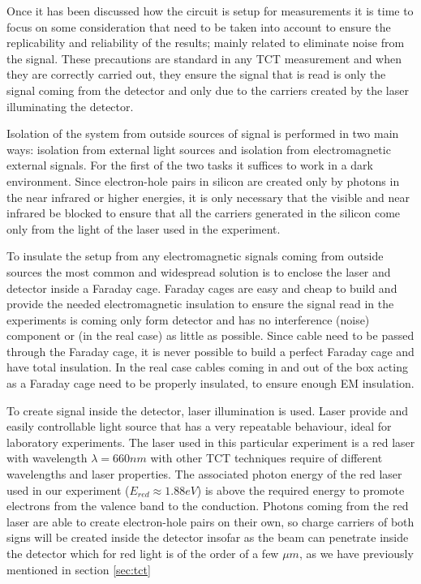 Once it has been discussed how the circuit is setup for measurements it is time to focus on some consideration that need to be taken into account to ensure the replicability and reliability of the results; mainly related to eliminate noise from the signal. These precautions are standard in any TCT measurement and when they are correctly carried out, they ensure the signal that is read is  only the signal coming from the detector and only due to the carriers created by the laser illuminating the detector.

Isolation of the system from outside sources of signal is performed in two main ways: isolation from external light sources and isolation from electromagnetic external signals. For the first of the two tasks it suffices to work in a dark environment. Since electron-hole pairs in silicon are created only by photons in the near infrared or higher energies, it is only necessary that the visible and near infrared be blocked to ensure that all the carriers generated in the silicon come only from the light of the laser used in the experiment.

To insulate the setup from any electromagnetic signals coming from outside sources the most common and widespread solution is to enclose the laser and detector inside a Faraday cage. Faraday cages are easy and cheap to build and provide the needed electromagnetic insulation to ensure the signal read in the experiments is coming only form detector and has no interference (noise) component or (in the real case) as little as possible. Since cable need to be passed through the Faraday cage, it is never possible to build a perfect Faraday cage and have total insulation. In the real case cables coming in and out of the box acting as a Faraday cage need to be properly insulated, to ensure enough EM insulation.

To create signal inside the detector, laser illumination is used. Laser provide and easily controllable light source that has a very repeatable behaviour, ideal for laboratory experiments. The laser used in this particular experiment is a red laser with wavelength $\lambda = 660nm$ with other TCT techniques require of different wavelengths and laser properties. The associated photon energy of the red laser used in our experiment ($E_{red} \approx 1.88 eV$) is above the required energy to promote electrons from the valence band to the conduction. Photons coming from the red laser are able to create electron-hole pairs on their own, so charge carriers of both signs will be created inside the detector insofar as the beam can penetrate inside the detector which for red light is of the order of a few $\mu m$, as we have previously mentioned in section \ref{sec:tct}

